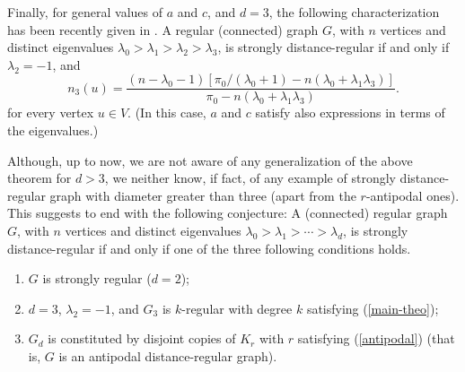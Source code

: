 \documentclass[11pt]{article}
\begin{document}
Finally, for general values of $a$ and $c$, and $d=3$,
the following characterization has been recently given in
\cite{f98}.   A regular (connected) graph $G$, with $n$ vertices and
distinct eigenvalues
$\lambda_0>\lambda_1>\lambda_2>\lambda_3$, is strongly
distance-regular if and only if
$\lambda_2=-1$, and 
\begin{equation}
\label{main-theo}
n_3(u)=\frac{(n-\lambda_0-1)[\pi_0/(\lambda_0+1)-n(\lambda_0
+\lambda_1\lambda_3)]}
{\pi_0-n(\lambda_0+\lambda_1\lambda_3)}.
\end{equation}
for every vertex $u\in V$. (In this case, $a$ and $c$ satisfy also
expressions in terms of the eigenvalues.)

Although, up to now, we are not aware of any generalization of the
above theorem for $d> 3$,  we neither know, if fact, of
any example of strongly distance-regular graph with diameter
greater  than three (apart from the $r$-antipodal ones). This
suggests to end with the following conjecture: A  (connected)
regular graph $G$, with $n$ vertices and distinct eigenvalues
$\lambda_0>\lambda_1>\cdots>\lambda_d$, is strongly 
distance-regular if and only if one of the three following conditions
holds.
\begin{enumerate}
\item
$G$ is strongly regular ($d=2$);  
\item
$d=3$, $\lambda_2=-1$, and $G_3$ is $k$-regular with
degree 
$k$ satisfying  (\ref{main-theo}); 
\item
$G_d$ is constituted by disjoint copies of  
$K_r$ with $r$ satisfying (\ref{antipodal})  (that is, $G$ is an 
antipodal distance-regular graph).
\end{enumerate}
\end{document}
